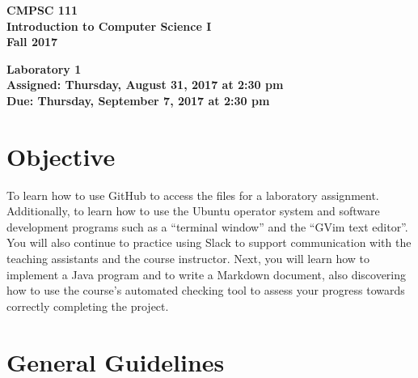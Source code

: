 \documentclass[11pt]{article}
\newcommand{\assignmentduedate}{September 7}
\newcommand{\assignmentassignedate}{August 31}
\newcommand{\labyear}{2017}
\newcommand{\labday}{Thursday}
\newcommand{\labtime}{2:30 pm}
\newcommand{\assigneddate}{Assigned: \labday, \assignmentassignedate, \labyear{} at \labtime{}}
\newcommand{\duedate}{Due: \labday, \assignmentduedate, \labyear{} at \labtime{}}
\newcommand{\labtitle}[1]
{
  \begin{center}
    \begin{center}
      \bf
      CMPSC 111\\Introduction to Computer Science I\\
      Fall 2017\\
      \medskip
    \end{center}
    \bf
    #1
  \end{center}
}
\begin{document}
\thispagestyle{empty}

\labtitle{Laboratory 1 \\ \assigneddate{} \\ \duedate{}}

\section*{Objective}

To learn how to use GitHub to access the files for a laboratory assignment. Additionally, to learn how to use the Ubuntu
operator system and software development programs such as a ``terminal window'' and the ``GVim text editor''. You will
also continue to practice using Slack to support communication with the teaching assistants and the course instructor.
Next, you will learn how to implement a Java program and to write a Markdown document, also discovering how to use the
course's automated checking tool to assess your progress towards correctly completing the project.


\section*{General Guidelines}
\end{document}
